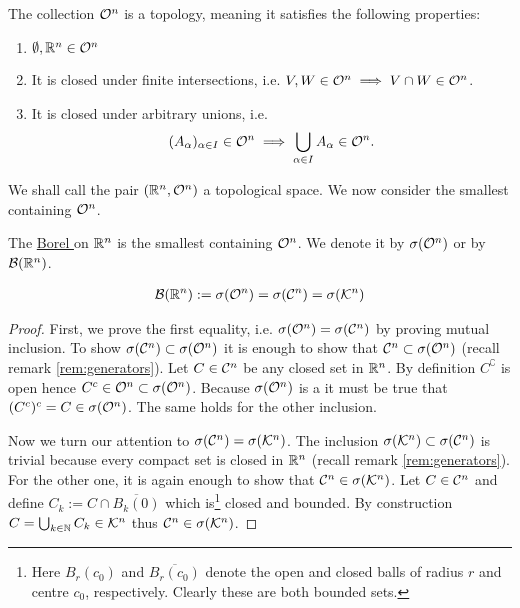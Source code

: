 The collection $\mathcal{O}^n$ is a topology, meaning it satisfies the following properties:
\begin{enumerate}
	\item $\emptyset, \mathbb{R}^n \in \mathcal{O}^n$
	\item It is closed under finite intersections, i.e. $V, W \in \mathcal{O}^n \implies V \cap W \in \mathcal{O}^n$.
	\item It is closed under arbitrary unions, i.e.
	\begin{align*}
		(A_\alpha)_{\alpha \in I} \in \mathcal{O}^n \implies \bigcup_{\alpha \in I} A_\alpha \in \mathcal{O}^n.
	\end{align*}
\end{enumerate}

We shall call the pair $(\mathbb{R}^n, \mathcal{O}^n)$ a topological space. We now consider the smallest \siga containing $\mathcal{O}^n$.

\begin{dfn}
	The \underline{Borel \siga} on $\mathbb{R}^n$ is the smallest \siga containing $\mathcal{O}^n$. We denote it by $\sigma(\mathcal{O}^n)$ or by $\mathcal{B}(\mathbb{R}^n)$.
\end{dfn}

\begin{thm}
	\begin{align*}
		\mathcal{B}(\mathbb{R}^n) := \sigma(\mathcal{O}^n) = \sigma(\mathcal{C}^n) = \sigma(\mathcal{K}^n)
	\end{align*}
\end{thm}

\begin{proof}
	First, we prove the first equality, i.e. $\sigma(\mathcal{O}^n) = \sigma(\mathcal{C}^n)$ by proving mutual inclusion. To show $\sigma(\mathcal{C}^n) \subset \sigma(\mathcal{O}^n)$ it is enough to show that $\mathcal{C}^n \subset \sigma(\mathcal{O}^n)$ (recall remark \ref{rem:generators}). Let $C \in \mathcal{C}^n$ be any closed set in $\mathbb{R}^n$. By definition $C^\complement$ is open hence $C^c \in \mathcal{O}^n \subset \sigma(\mathcal{O}^n)$. Because $\sigma(\mathcal{O}^n)$ is a \siga it must be true that $(C^c)^c = C \in \sigma(\mathcal{O}^n)$. The same holds for the other inclusion.
	
	Now we turn our attention to $\sigma(\mathcal{C}^n) = \sigma(\mathcal{K}^n)$. The inclusion $\sigma(\mathcal{K}^n) \subset \sigma (\mathcal{C}^n)$ is trivial because every compact set is closed in $\mathbb{R}^n$ (recall remark \ref{rem:generators}). For the other one, it is again enough to show that $\mathcal{C}^n \in \sigma(\mathcal{K}^n)$. Let $C \in \mathcal{C}^n$ and define $C_k := C \cap \overline{B_k(0)}$ which is\footnote{Here $B_r(c_0)$ and $\overline{B_r(c_0)}$ denote the open and closed balls of radius $r$ and centre $c_0$, respectively. Clearly these are both bounded sets.} closed and bounded. By construction $C = \bigcup_{k \in \mathbb{N}} C_k \in \mathcal{K}^n$ thus $\mathcal{C}^n \in \sigma(\mathcal{K}^n)$.
\end{proof}

